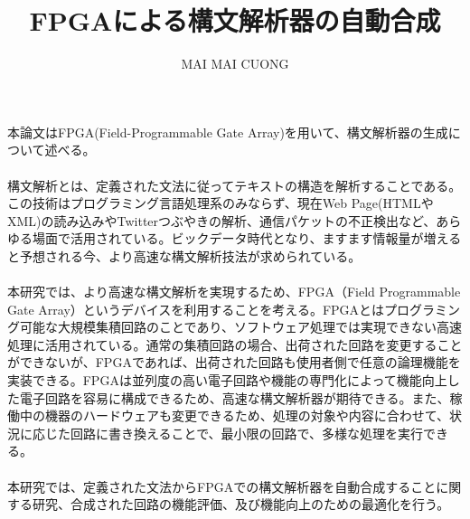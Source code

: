 \documentclass[12pt,oneside]{report}
\begin{document}
\title{FPGAによる構文解析器の自動合成}
\author{MAI MAI CUONG}






\beforepreface
\tablespagefalse

本論文はFPGA(Field-Programmable Gate Array)を用いて、構文解析器の生成について述べる。\\
\\
構文解析とは、定義された文法に従ってテキストの構造を解析することである。この技術はプログラミング言語処理系のみならず、現在Web Page(HTMLやXML)の読み込みやTwitterつぶやきの解析、通信パケットの不正検出など、あらゆる場面で活用されている。ビックデータ時代となり、ますます情報量が増えると予想される今、より高速な構文解析技法が求められている。\\
\\
本研究では、より高速な構文解析を実現するため、FPGA（Field Programmable Gate Array）というデバイスを利用することを考える。FPGAとはプログラミング可能な大規模集積回路のことであり、ソフトウェア処理では実現できない高速処理に活用されている。通常の集積回路の場合、出荷された回路を変更することができないが、FPGAであれば、出荷された回路も使用者側で任意の論理機能を実装できる。FPGAは並列度の高い電子回路や機能の専門化によって機能向上した電子回路を容易に構成できるため、高速な構文解析器が期待できる。また、稼働中の機器のハードウェアも変更できるため、処理の対象や内容に合わせて、状況に応じた回路に書き換えることで、最小限の回路で、多様な処理を実行できる。\\
\\
本研究では、定義された文法からFPGAでの構文解析器を自動合成することに関する研究、合成された回路の機能評価、及び機能向上のための最適化を行う。\\
\\
\end{document}
